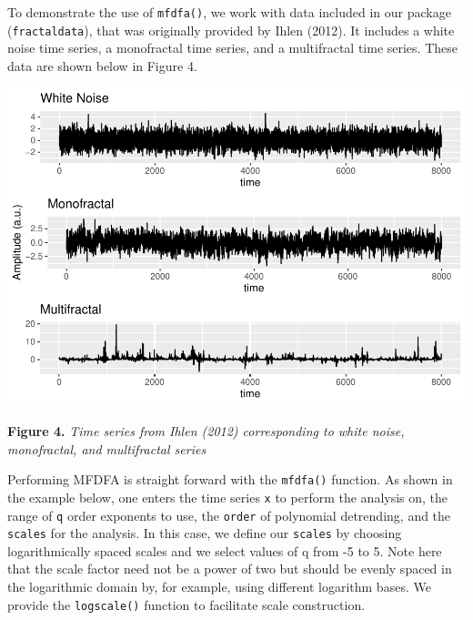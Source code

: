 \documentclass[
  man]{apa6}
\begin{document}
To demonstrate the use of \texttt{mfdfa()}, we work with data included in our
package (\texttt{fractaldata}), that was originally provided by
Ihlen (2012). It includes a white noise
time series, a monofractal time series, and a multifractal time series.
These data are shown below in Figure 4.

\includegraphics{fractal_regression_paper_brm_files/figure-latex/unnamed-chunk-9-1.pdf}

\textbf{Figure 4.} \emph{Time series from Ihlen (2012) corresponding to white
noise, monofractal, and multifractal series}

Performing MFDFA is straight forward with the \texttt{mfdfa()} function. As
shown in the example below, one enters the time series \texttt{x} to perform
the analysis on, the range of \texttt{q} order exponents to use, the \texttt{order} of
polynomial detrending, and the \texttt{scales} for the analysis. In this case,
we define our \texttt{scales} by choosing logarithmically spaced scales and we
select values of q from -5 to 5. Note here that the scale factor need
not be a power of two but should be evenly spaced in the logarithmic
domain by, for example, using different logarithm bases. We provide the
\texttt{logscale()} function to facilitate scale construction.
\end{document}
